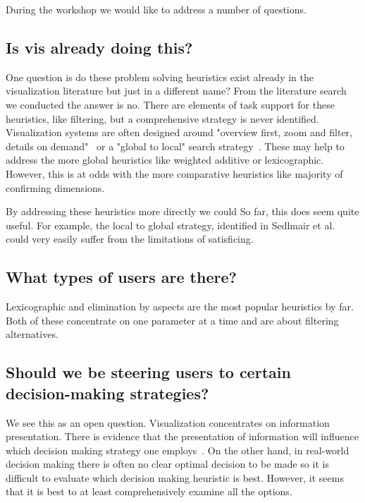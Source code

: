 During the workshop we would like to address a number of questions.

\subsection{Is vis already doing this?}
\label{is-vis-already-doing-this}

One question is do these problem solving heuristics exist already in the
visualization literature but just in a different name? From the literature
search we conducted the answer is no. There are elements of task support for
these heuristics, like filtering, but a comprehensive strategy is never
identified. Visualization systems are often designed around 
"overview first, zoom and filter, details on demand"~\cite{Shneiderman} or
a "global to local" search strategy~\cite{Sedlmair:2014}. These may help to
address the more global heuristics like weighted additive or lexicographic.
However, this is at odds with the more comparative heuristics like majority
of confirming dimensions. 

By addressing these heuristics more directly we could 
So far, this does seem quite useful. For example, the local to global
strategy, identified in Sedlmair et al.~\citep{Sedlmair:2014} could very
easily suffer from the limitations of satisficing.


\subsection{What types of users are there?}
\label{what-types-of-users-are-there}

Lexicographic and elimination by aspects are the most popular heuristics
by far. Both of these concentrate on one parameter at a time and are
about filtering alternatives.

\subsection{Should we be steering users to certain decision-making strategies?}

We see this as an open question. Visualization concentrates on information
presentation. There is evidence that the presentation of information
will influence which decision making strategy one employs~.
On the other hand, in real-world decision making there is often no clear
optimal decision to be made so it is difficult to evaluate which decision
making heuristic is best. However, it seems that it is best to at least
comprehensively examine all the options.

